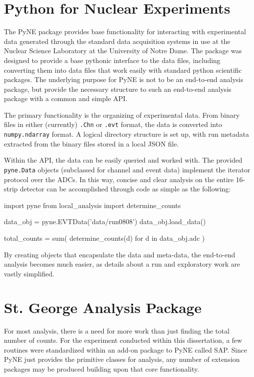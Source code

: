 \section{Python for Nuclear Experiments}

The PyNE package provides base functionality for interacting with
experimental data generated through the standard data acquisition
systems in use at the Nuclear Science Laboratory at the University of
Notre Dame. The package was designed to provide a base pythonic
interface to the data files, including converting them into data files
that work easily with standard python scientific packages. The
underlying purpose for PyNE is not to be an end-to-end analysis package,
but provide the necessary structure to such an end-to-end analysis
package with a common and simple API.

The primary functionality is the organizing of experimental data. From
binary files in either (currently) \verb+.Chn+ or \verb+.evt+ format,
the data is converted into \verb+numpy.ndarray+ format. A logical
directory structure is set up, with run metadata extracted from the
binary files stored in a local JSON file.

Within the API, the data can be easily queried and worked with. The
provided \verb+pyne.Data+ objects (subclassed for channel and event
data) implement the iterator protocol over the ADCs. In this way,
concise and clear analysis on the entire 16-strip detector can be
accomplished through code as simple as the following:

\begin{python}
import pyne
from local_analysis import determine_counts

data_obj = pyne.EVTData('data/run0808')
data_obj.load_data()

total_counts = sum(
    determine_counts(d) for d in data_obj.adc
)
\end{python}

By creating objects that encapsulate the data and meta-data, the
end-to-end analysis becomes much easier, as details about a run and
exploratory work are vastly simplified.

\section{St. George Analysis Package}

For most analysis, there is a need for more work than just finding the
total number of counts. For the experiment conducted within this
dissertation, a few routines were standardized within an add-on package
to PyNE called SAP. Since PyNE just provides the primitive
classes for analysis, any number of extension packages may be produced
building upon that core functionality.


